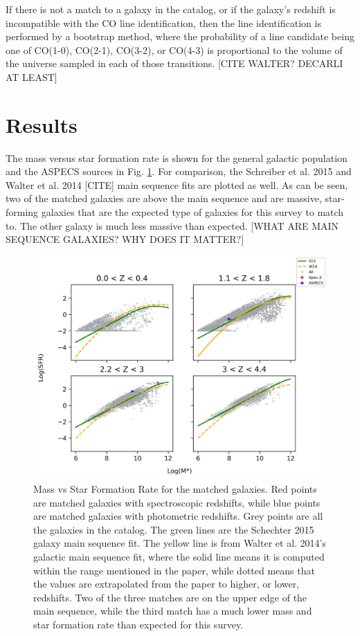 If there is not a match to a galaxy in the catalog, or if the galaxy's redshift is incompatible with the CO line identification, then the line identification is performed by a bootstrap method, where the probability of a line candidate being one of CO(1-0), CO(2-1), CO(3-2), or CO(4-3) is proportional to the volume of the universe sampled in each of those transitions. [CITE WALTER? DECARLI AT LEAST] 

\section{Results}

The mass versus star formation rate is shown for the general galactic population and the ASPECS sources in Fig. \ref{fig:Cross_match}. For comparison, the Schreiber et al. 2015 \cite{schreiber2015herschel} and Walter et al. 2014 [CITE] main sequence fits are plotted as well. As can be seen, two of the matched galaxies are above the main sequence and are massive, star-forming galaxies that are the expected type of galaxies for this survey to match to. The other galaxy is much less massive than expected. [WHAT ARE MAIN SEQUENCE GALAXIES? WHY DOES IT MATTER?]

\begin{figure}[tbp]
\centering \includegraphics[width=120mm]{Mstar_vs_SFR_all_closest_sep_1_0_sn_fid_60.png}
\caption{Mass vs Star Formation Rate for the matched galaxies. Red points are matched galaxies with spectroscopic redshifts, while blue points are matched galaxies with photometric redshifts. Grey points are all the galaxies in the catalog. The green lines are the Schechter 2015 galaxy main sequence fit. The yellow line is from Walter et al. 2014's galactic main sequence fit, where the solid line means it is computed within the range mentioned in the paper, while dotted means that the values are extrapolated from the paper to higher, or lower, redshifts. Two of the three matches are on the upper edge of the main sequence, while the third match has a much lower mass and star formation rate than expected for this survey.}
\label{fig:Cross_match}
\end{figure}

